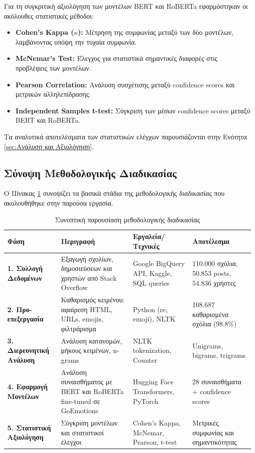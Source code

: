 \documentclass[a4paper,11pt,oneside,openany]{ioniothesis}
\begin{document}
Για τη συγκριτική αξιολόγηση των μοντέλων BERT και RoBERTa εφαρμόστηκαν οι ακόλουθες στατιστικές μέθοδοι:

\begin{itemize}
    \item \textbf{Cohen's Kappa ($\kappa$):} Μέτρηση της συμφωνίας μεταξύ των δύο μοντέλων, λαμβάνοντας υπόψη την τυχαία συμφωνία.
    
    \item \textbf{McNemar's Test:} Έλεγχος για στατιστικά σημαντικές διαφορές στις προβλέψεις των μοντέλων.
    
    \item \textbf{Pearson Correlation:} Ανάλυση συσχέτισης μεταξύ confidence scores και μετρικών αλληλεπίδρασης.
    
    \item \textbf{Independent Samples t-test:} Σύγκριση των μέσων confidence scores μεταξύ BERT και RoBERTa.
\end{itemize}

Τα αναλυτικά αποτελέσματα των στατιστικών ελέγχων παρουσιάζονται στην Ενότητα \ref{sec:Ανάλυση και Αξιολόγηση}.


\subsection{Σύνοψη Μεθοδολογικής Διαδικασίας}
\label{sec:Σύνοψη Μεθοδολογικής Διαδικασίας}

Ο Πίνακας \ref{tab:methodology_summary} συνοψίζει τα βασικά στάδια της μεθοδολογικής διαδικασίας που ακολουθήθηκε στην παρούσα εργασία.

\begin{table}[H]
\centering
\caption{Συνοπτική παρουσίαση μεθοδολογικής διαδικασίας}
\label{tab:methodology_summary}
\small
\begin{tabular}{@{}p{2.5cm}p{4.5cm}p{3.5cm}p{3.5cm}@{}}
\toprule
\textbf{Φάση} & \textbf{Περιγραφή} & \textbf{Εργαλεία/Τεχνικές} & \textbf{Αποτέλεσμα} \\
\midrule
\textbf{1. Συλλογή Δεδομένων} & 
Εξαγωγή σχολίων, δημοσιεύσεων και χρηστών από Stack Overflow & 
Google BigQuery API, Kaggle, SQL queries & 
110.000 σχόλια, 50.853 posts, 54.836 χρήστες \\
\midrule
\textbf{2. Προ-επεξεργασία} & 
Καθαρισμός κειμένου: αφαίρεση HTML, URLs, emojis, φιλτράρισμα & 
Python (re, emoji), NLTK & 
108.687 καθαρισμένα σχόλια (98.8\%) \\
\midrule
\textbf{3. Διερευνητική Ανάλυση} & 
Ανάλυση κατανομών, μήκους κειμένων, n-grams & 
NLTK tokenization, Counter & 
Unigrams, bigrams, trigrams \\
\midrule
\textbf{4. Εφαρμογή Μοντέλων} & 
Ανάλυση συναισθήματος με BERT και RoBERTa fine-tuned σε GoEmotions & 
Hugging Face Transformers, PyTorch & 
28 συναισθήματα + confidence scores \\
\midrule
\textbf{5. Στατιστική Αξιολόγηση} & 
Σύγκριση μοντέλων και στατιστικοί έλεγχοι & 
Cohen's Kappa, McNemar, Pearson, t-test & 
Μετρικές συμφωνίας και σημαντικότητας \\
\bottomrule
\end{tabular}
\end{table}
\end{document}
